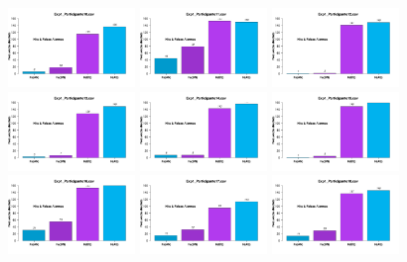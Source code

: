 \documentclass[a4paper ]{article}
\begin{document}
\begin{figure}[th]
\includegraphics[width=0.3\textwidth]{Figures/MirrorRate_Exp1_P10} \includegraphics[width=0.3\textwidth]{Figures/MirrorRate_Exp1_P11} \includegraphics[width=0.3\textwidth]{Figures/MirrorRate_Exp1_P12}
\includegraphics[width=0.3\textwidth]{Figures/MirrorRate_Exp1_P13} \includegraphics[width=0.3\textwidth]{Figures/MirrorRate_Exp1_P14} \includegraphics[width=0.3\textwidth]{Figures/MirrorRate_Exp1_P15}
\includegraphics[width=0.3\textwidth]{Figures/MirrorRate_Exp1_P16} \includegraphics[width=0.3\textwidth]{Figures/MirrorRate_Exp1_P17} \includegraphics[width=0.3\textwidth]{Figures/MirrorRate_Exp1_P18}

\end{figure}
\end{document}
